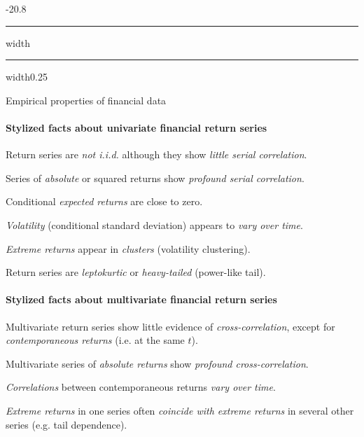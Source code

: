 \documentclass[a4paper,landscape,8pt,fleqn]{scrartcl}
\makeatletter
\renewcommand{\section}{\@startsection{section}{1}{0mm}%
{-2\baselineskip}{0.8\baselineskip}%
{\hrule depth 0.2pt width\columnwidth\hrule depth1.5pt
width0.25\columnwidth\vspace*{1.2em}\Large\bfseries}}
\makeatother
\begin{document}
\begin{multicols*}{3}

\section{Empirical properties of financial data}

\paragraph{Stylized facts about univariate financial return series}
\begin{description}[style=multiline,leftmargin=0.8cm,font=\textbf]
\item[(U1)] Return series are \textit{not i.i.d.} although they show \textit{little serial correlation}.
\item[(U2)] Series of \textit{absolute} or squared returns show \textit{profound serial correlation}.
\item[(U3)] Conditional \textit{expected returns} are close to zero.
\item[(U4)] \textit{Volatility} (conditional standard deviation) appears to \textit{vary over time}.
\item[(U5)] \textit{Extreme returns} appear in \textit{clusters} (volatility clustering).
\item[(U6)] Return series are \textit{leptokurtic} or \textit{heavy-tailed} (power-like tail).
\end{description}

\paragraph{Stylized facts about multivariate financial return series}
\begin{description}[style=multiline,leftmargin=0.8cm,font=\textbf]
\item[(M1)] Multivariate return series show little evidence of \textit{cross-correlation}, except for \textit{contemporaneous returns} (i.e. at the same $t$).
\item[(M2)] Multivariate series of \textit{absolute returns} show \textit{profound cross-correlation}.
\item[(M3)] \textit{Correlations} between contemporaneous returns \textit{vary over time}.
\item[(M4)] \textit{Extreme returns} in one series often \textit{coincide with extreme returns} in several other series (e.g. tail dependence).
\end{description}


\end{multicols*}
\end{document}
